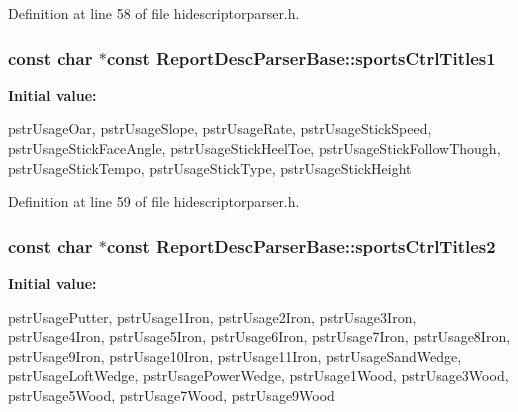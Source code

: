\-Definition at line 58 of file hidescriptorparser.\-h.

\hypertarget{class_report_desc_parser_base_a24a3f083c728c7549929cb8af0e52451}{
\subsubsection[{sports\-Ctrl\-Titles1}]{\setlength{\rightskip}{0pt plus 5cm}const char $\ast$const {\bf \-Report\-Desc\-Parser\-Base\-::sports\-Ctrl\-Titles1}}}\label{class_report_desc_parser_base_a24a3f083c728c7549929cb8af0e52451}
{\bfseries \-Initial value\-:}
\begin{DoxyCode}
 {
        pstrUsageOar,
        pstrUsageSlope,
        pstrUsageRate,
        pstrUsageStickSpeed,
        pstrUsageStickFaceAngle,
        pstrUsageStickHeelToe,
        pstrUsageStickFollowThough,
        pstrUsageStickTempo,
        pstrUsageStickType,
        pstrUsageStickHeight
}
\end{DoxyCode}


\-Definition at line 59 of file hidescriptorparser.\-h.

\hypertarget{class_report_desc_parser_base_a9491a62b6a44bf98884ca1dd16b45df2}{
\subsubsection[{sports\-Ctrl\-Titles2}]{\setlength{\rightskip}{0pt plus 5cm}const char $\ast$const {\bf \-Report\-Desc\-Parser\-Base\-::sports\-Ctrl\-Titles2}}}\label{class_report_desc_parser_base_a9491a62b6a44bf98884ca1dd16b45df2}
{\bfseries \-Initial value\-:}
\begin{DoxyCode}
 {
        pstrUsagePutter,
        pstrUsage1Iron,
        pstrUsage2Iron,
        pstrUsage3Iron,
        pstrUsage4Iron,
        pstrUsage5Iron,
        pstrUsage6Iron,
        pstrUsage7Iron,
        pstrUsage8Iron,
        pstrUsage9Iron,
        pstrUsage10Iron,
        pstrUsage11Iron,
        pstrUsageSandWedge,
        pstrUsageLoftWedge,
        pstrUsagePowerWedge,
        pstrUsage1Wood,
        pstrUsage3Wood,
        pstrUsage5Wood,
        pstrUsage7Wood,
        pstrUsage9Wood
}
\end{DoxyCode}


